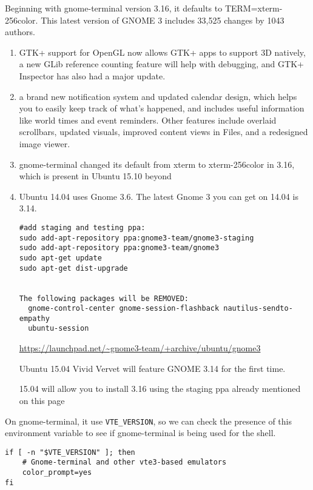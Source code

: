 Beginning with gnome-terminal version 3.16, it defaults to TERM=xterm-256color.
This latest version of GNOME 3 includes 33,525 changes by 1043 authors.
\begin{enumerate}
  \item   GTK+ support for OpenGL now allows GTK+ apps to support 3D natively, a new GLib
reference counting feature will help with debugging, and GTK+ Inspector has also had a major update.
  \item  a brand new notification system and updated calendar design, which
  helps you to easily keep track of what's happened, and includes useful
  information like world times and event reminders. Other features include
  overlaid scrollbars, updated visuals, improved content views in Files, and a
  redesigned image viewer.   
  
  \item gnome-terminal changed its default from xterm to xterm-256color in 3.16,
  which is present in Ubuntu 15.10 beyond

  \item Ubuntu 14.04 uses Gnome 3.6. The latest Gnome 3 you can get on 14.04 is 3.14.
\begin{verbatim}
#add staging and testing ppa:
sudo add-apt-repository ppa:gnome3-team/gnome3-staging
sudo add-apt-repository ppa:gnome3-team/gnome3
sudo apt-get update
sudo apt-get dist-upgrade


The following packages will be REMOVED:
  gnome-control-center gnome-session-flashback nautilus-sendto-empathy
  ubuntu-session

\end{verbatim}
\url{https://launchpad.net/~gnome3-team/+archive/ubuntu/gnome3}

Ubuntu 15.04 Vivid Vervet will feature GNOME 3.14 for the first time.

15.04 will allow you to install 3.16 using the staging ppa already mentioned on this page
  
\end{enumerate}

On gnome-terminal, it use \verb!VTE_VERSION!, so we can check the presence of
this environment variable to see if gnome-terminal is being used for the shell.

\begin{verbatim}
if [ -n "$VTE_VERSION" ]; then
    # Gnome-terminal and other vte3-based emulators
    color_prompt=yes
fi
\end{verbatim}



